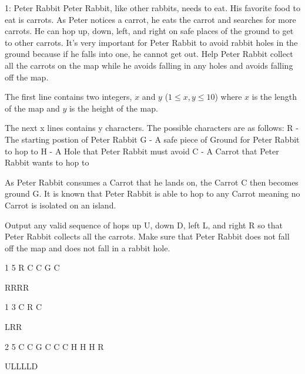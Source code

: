 \begin{problem}{1: Peter Rabbit}
Peter Rabbit, like other rabbits, needs to eat. His favorite food to eat is carrots.
As Peter notices a carrot, he eats the carrot and searches for more carrots.
He can hop up, down, left, and right on safe places of the ground to get to other carrots.
It's very important for Peter Rabbit to avoid rabbit holes in the ground because if he falls into one, he cannot get out.
Help Peter Rabbit collect all the carrots on the map while he avoids falling in any holes and avoids falling off the map.
\end{problem}

\begin{formalin}
The first line contains two integers, $x$ and $y$ ($1 \leq x, y \leq 10$) where $x$ is the length of the map and $y$ is the height of the map.

The next x lines contains y characters. The possible characters are as follows:
R - The starting postion of Peter Rabbit
G - A safe piece of Ground for Peter Rabbit to hop to
H - A Hole that Peter Rabbit must avoid
C - A Carrot that Peter Rabbit wants to hop to

As Peter Rabbit consumes a Carrot that he lands on, the Carrot C then becomes ground G.
It is known that Peter Rabbit is able to hop to any Carrot meaning no Carrot is isolated on an island.
\end{formalin}

\begin{formalout}
Output any valid sequence of hops up U, down D, left L, and right R so that Peter Rabbit collects all the carrots.
Make sure that Peter Rabbit does not fall off the map and does not fall in a rabbit hole.
\end{formalout}

\begin{datain}
1 5
R C C G C
\end{datain}
\begin{dataout}
RRRR
\end{dataout}

\begin{datain}
1 3
C R C
\end{datain}
\begin{dataout}
LRR
\end{dataout}

\begin{datain}
2 5
C C G C C
C H H H R
\end{datain}
\begin{dataout}
ULLLLD
\end{dataout}
